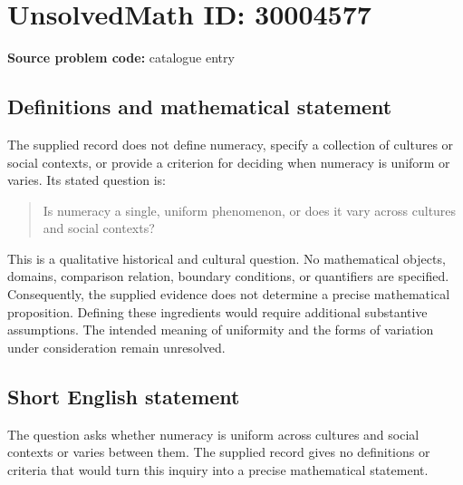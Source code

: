 \documentclass[11pt]{article}
\begin{document}
\section*{UnsolvedMath ID: 30004577}
\textbf{Source problem code:} catalogue entry
\subsection{Definitions and mathematical statement}
The supplied record does not define numeracy, specify a collection of cultures or social contexts, or provide a criterion for deciding when numeracy is uniform or varies. Its stated question is:
\begin{quote}
Is numeracy a single, uniform phenomenon, or does it vary across cultures and social contexts?
\end{quote}
This is a qualitative historical and cultural question. No mathematical objects, domains, comparison relation, boundary conditions, or quantifiers are specified. Consequently, the supplied evidence does not determine a precise mathematical proposition. Defining these ingredients would require additional substantive assumptions. The intended meaning of uniformity and the forms of variation under consideration remain unresolved.
\subsection{Short English statement}
The question asks whether numeracy is uniform across cultures and social contexts or varies between them. The supplied record gives no definitions or criteria that would turn this inquiry into a precise mathematical statement.
\end{document}
